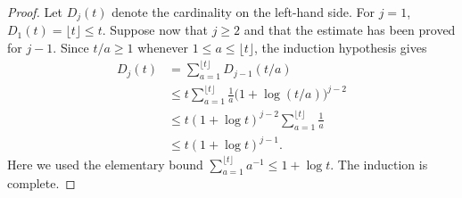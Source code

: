 \documentclass[letterpaper,11pt]{amsart}
\numberwithin{equation}{section}     %
\def\le{\leqslant}
\def\ge{\geqslant}
\begin{document}
\begin{proof}
Let $D_j(t)$ denote the cardinality on the left-hand side. For $j=1$,
$D_1(t)=\lfloor t\rfloor\le t$. Suppose now that $j\ge 2$ and that the
estimate has been proved for $j-1$. Since $t/a\ge 1$ whenever
$1\le a\le \lfloor t\rfloor$, the induction hypothesis gives
\[
\begin{aligned}
D_j(t)
&=\sum_{a=1}^{\lfloor t\rfloor}D_{j-1}(t/a) \\
&\le t\sum_{a=1}^{\lfloor t\rfloor}\frac{1}{a}
   \bigl(1+\log(t/a)\bigr)^{j-2} \\
&\le t(1+\log t)^{j-2}\sum_{a=1}^{\lfloor t\rfloor}\frac{1}{a} \\
&\le t(1+\log t)^{j-1}.
\end{aligned}
\]
Here we used the elementary bound
$\sum_{a=1}^{\lfloor t\rfloor}a^{-1}\le 1+\log t$. The induction is
complete.
\end{proof}
\end{document}
